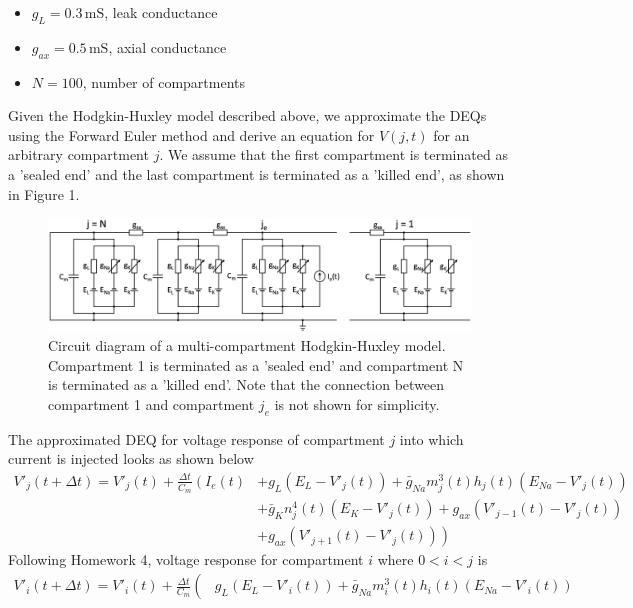 \documentclass[12pt]{article}
\begin{document}
\begin{enumerate}
\begin{itemize}
        \item $g_{L}=0.3 \, \text{mS}$, leak conductance
        \item $g_{ax}=0.5 \, \text{mS}$, axial conductance
        \item $N=100$, number of compartments
    \end{itemize}
    Given the Hodgkin-Huxley model described above, we approximate the DEQs using the Forward Euler method and 
    derive an equation for $V(j, t)$ for an arbitrary compartment $j$. We assume that the first compartment is 
    terminated as a 'sealed end' and the last compartment is terminated as a 'killed end', as shown in Figure 1.
    \begin{figure}[h]
        \centering
        \includegraphics[width=1\textwidth]{Circuit_final.png}
        \caption{Circuit diagram of a multi-compartment Hodgkin-Huxley model. Compartment 1 is terminated as a 'sealed end' and 
        compartment N is terminated as a 'killed end'. Note that the connection between compartment 1 and compartment $j_{e}$ is not 
        shown for simplicity.}
    \end{figure}
    \newline The approximated DEQ for voltage response of compartment $j$ into which current is injected looks as shown below
    \begin{align*}
        V'_{j}(t + \Delta t) = V'_{j}(t) + \frac{\Delta t}{C_{m}}\left(I_{e}(t) \right. &+ g_{L}\left(E_{L}-V'_{j}(t)\right) + \bar{g}_{Na}m^{3}_{j}(t)h_{j}(t)\left(E_{Na}-V'_{j}(t)\right)\\
                                                                                        &+ \bar{g}_{K}n^{4}_{j}(t)\left(E_{K}-V'_{j}(t)\right) + g_{ax}\left(V'_{j-1}(t)-V'_{j}(t)\right)\\
                                                                                        &+ g_{ax} \left. \left(V'_{j+1}(t)-V'_{j}(t)\right)\right)
    \end{align*}
    Following Homework 4, voltage response for compartment $i$ where $0 < i < j$ is
    \begin{align*}
        V'_{i}(t + \Delta t) = V'_{i}(t) + \frac{\Delta t}{C_{m}}\left(\right. & g_{L}\left(E_{L}-V'_{i}(t)\right) + \bar{g}_{Na}m^{3}_{i}(t)h_{i}(t)\left(E_{Na}-V'_{i}(t)\right)\\

\end{align*}
\end{enumerate}
\end{document}
